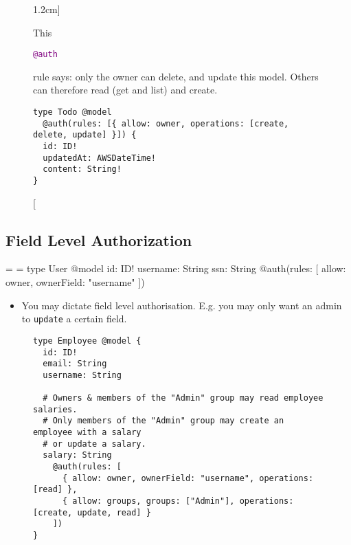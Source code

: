 \documentclass{tufte-handout}
\makeatletter
\providecommand{\tightlist}{%
  \setlength{\itemsep}{0pt}\setlength{\parskip}{0pt}}
\newenvironment{marginlisting}
  {\fvset{fontsize=\small, tabsize=2}%
   \setbox\marginlistingbox=\vtop\bgroup
     \hsize=\marginparwidth
     \topsep=0pt\partopsep=0pt
     \vspace*{-1.4\baselineskip}%
     \Verbatim}
  {\endVerbatim\egroup\marginnote{\leavevmode\box\marginlistingbox}}
\newcommand{\cde}[1]{
  \textcolor{purple}{\texttt{#1}}
}
\newcommand{\auth}{
  \cde{@auth}
}
\makeatother
\begin{document}
\begin{figure}[h]
\caption[][1.2cm]{This \auth rule says: only the owner can delete, and update this model. Others can therefore read (get and list) and create.}
\begin{lstlisting}
type Todo @model
  @auth(rules: [{ allow: owner, operations: [create, delete, update] }]) {
  id: ID!
  updatedAt: AWSDateTime!
  content: String!
}
\end{lstlisting}
\end{figure}

\hypertarget{field-level-authorization}{%
\subsection{Field Level Authorization}\label{field-level-authorization}}

\begin{marginlisting}
type User @model {
  id: ID!
  username: String
  ssn: String @auth(rules: [
      { allow: owner,
      ownerField: "username" }
    ])
}
\end{marginlisting}


\begin{itemize}
\tightlist
\item
  You may dictate field level authorisation. E.g. you may only want an
  admin to \texttt{update} a certain field.
\end{itemize}

\begin{figure}
\begin{lstlisting}
type Employee @model {
  id: ID!
  email: String
  username: String

  # Owners & members of the "Admin" group may read employee salaries.
  # Only members of the "Admin" group may create an employee with a salary
  # or update a salary.
  salary: String
    @auth(rules: [
      { allow: owner, ownerField: "username", operations: [read] },
      { allow: groups, groups: ["Admin"], operations: [create, update, read] }
    ])
}
\end{lstlisting}
\end{figure}



    



  
\end{document}
